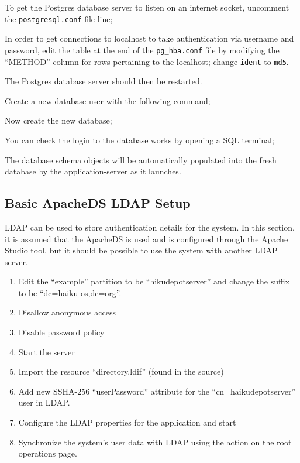 To get the Postgres database server to listen on an internet socket, uncomment the {\tt postgresql.conf} file line;


In order to get connections to localhost to take authentication via username and password, edit the table at the end of the {\tt pg\_hba.conf} file by modifying the ``METHOD'' column for rows pertaining to the localhost; change {\tt ident} to {\tt md5}.

The Postgres database server should then be restarted.

Create a new database user with the following command;


Now create the new database;


You can check the login to the database works by opening a SQL terminal;


The database schema objects will be automatically populated into the fresh database by the application-server as it launches.

\subsection{Basic ApacheDS LDAP Setup}


LDAP can be used to store authentication details for the system.  In this section, it is assumed that the \href{http://directory.apache.org}{ApacheDS} is used and is configured through the Apache Studio tool, but it should be possible to use the system with another LDAP server.

\begin{enumerate}
\item Edit the ``example'' partition to be ``hikudepotserver'' and change the suffix to be ``dc=haiku-os,dc=org''.
\item Disallow anonymous access
\item Disable password policy
\item Start the server
\item Import the resource ``directory.ldif'' (found in the source)
\item Add new SSHA-256 ``userPassword'' attribute for the ``cn=haikudepotserver'' user in LDAP.
\item Configure the LDAP properties for the application and start
\item Synchronize the system's user data with LDAP using the action on the root operations page.
\end{enumerate}

